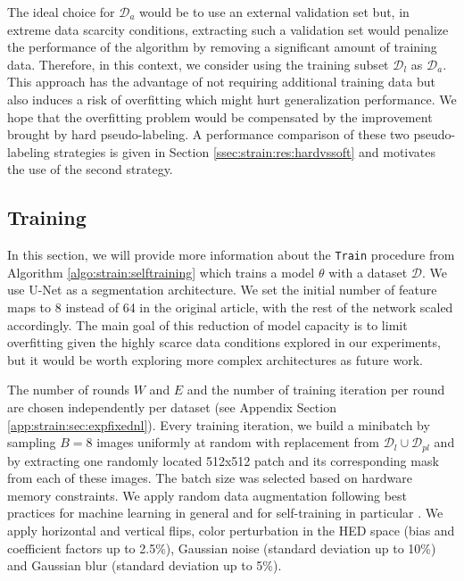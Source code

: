 The ideal choice for $\mathcal{D}_{a}$ would be to use an external validation set but, in extreme data scarcity conditions, extracting such a validation set would penalize the performance of the algorithm by removing a significant amount of training data. Therefore, in this context, we consider using the training subset $\mathcal{D}_l$ as $\mathcal{D}_a$.
This approach has the advantage of not requiring additional training data but also induces a risk of overfitting which might hurt generalization performance. We hope that the overfitting problem would be compensated by the improvement brought by hard pseudo-labeling. 
A performance comparison of these two pseudo-labeling strategies is given in Section \ref{ssec:strain:res:hardvssoft} and motivates the use of the second strategy.

\subsection{Training}
\label{ssec:strain:training_protocol}

In this section, we will provide more information about the \texttt{Train} procedure from Algorithm \ref{algo:strain:selftraining} which trains a model $\theta$ with a dataset $\mathcal{D}$.
We use U-Net \cite{ronneberger2015unet} as a segmentation architecture. We set the initial number of feature maps to 8 instead of 64 in the original article, with the rest of the network scaled accordingly. The main goal of this reduction of model capacity is to limit overfitting given the highly scarce data conditions explored in our experiments, but it would be worth exploring more complex architectures as future work.


The number of rounds $W$ and $E$ and the number of training iteration per round are chosen independently per dataset (see Appendix Section \ref{app:strain:sec:expfixednl}). Every training iteration, we build a minibatch by sampling $B=8$ images uniformly at random with replacement from $\mathcal{D}_l \cup \mathcal{D}_{pl}$ and by extracting one randomly located 512x512 patch and its corresponding mask from each of these images. The batch size was selected based on hardware memory constraints. We apply random data augmentation following best practices for machine learning in general and for self-training in particular \cite{xie2020self,sohn2020fixmatch}. We apply horizontal and vertical flips, color perturbation in the HED space \cite{tellez2018whole} (bias and coefficient factors up to 2.5\%), Gaussian noise (standard deviation up to 10\%) and Gaussian blur (standard deviation up to 5\%). 

